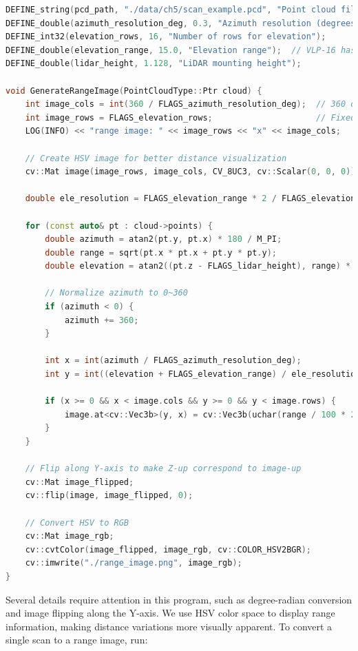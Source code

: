 \begin{lstlisting}[language=c++,caption=src/ch5/scan\_to\_range\_image.cc]
DEFINE_string(pcd_path, "./data/ch5/scan_example.pcd", "Point cloud file path");
DEFINE_double(azimuth_resolution_deg, 0.3, "Azimuth resolution (degrees)");
DEFINE_int32(elevation_rows, 16, "Number of rows for elevation");
DEFINE_double(elevation_range, 15.0, "Elevation range");  // VLP-16 has ±15 degree range
DEFINE_double(lidar_height, 1.128, "LiDAR mounting height");

void GenerateRangeImage(PointCloudType::Ptr cloud) {
	int image_cols = int(360 / FLAGS_azimuth_resolution_deg);  // 360 degrees horizontally divided by resolution
	int image_rows = FLAGS_elevation_rows;                     // Fixed number of rows
	LOG(INFO) << "range image: " << image_rows << "x" << image_cols;
	
	// Create HSV image for better distance visualization
	cv::Mat image(image_rows, image_cols, CV_8UC3, cv::Scalar(0, 0, 0));
	
	double ele_resolution = FLAGS_elevation_range * 2 / FLAGS_elevation_rows;  // Elevation resolution
	
	for (const auto& pt : cloud->points) {
		double azimuth = atan2(pt.y, pt.x) * 180 / M_PI;
		double range = sqrt(pt.x * pt.x + pt.y * pt.y);
		double elevation = atan2((pt.z - FLAGS_lidar_height), range) * 180 / M_PI;
		
		// Normalize azimuth to 0~360
		if (azimuth < 0) {
			azimuth += 360;
		}
		
		int x = int(azimuth / FLAGS_azimuth_resolution_deg);                      // Column
		int y = int((elevation + FLAGS_elevation_range) / ele_resolution + 0.5);  // Row
		
		if (x >= 0 && x < image.cols && y >= 0 && y < image.rows) {
			image.at<cv::Vec3b>(y, x) = cv::Vec3b(uchar(range / 100 * 255.0), 255, 127);
		}
	}
	
	// Flip along Y-axis to make Z-up correspond to image-up
	cv::Mat image_flipped;
	cv::flip(image, image_flipped, 0);
	
	// Convert HSV to RGB
	cv::Mat image_rgb;
	cv::cvtColor(image_flipped, image_rgb, cv::COLOR_HSV2BGR);
	cv::imwrite("./range_image.png", image_rgb);
}
\end{lstlisting}

Several details require attention in this program, such as degree-radian conversion and image flipping along the Y-axis. We use HSV color space to display range information, making distance variations more visually apparent. To convert a single scan to a range image, run:

